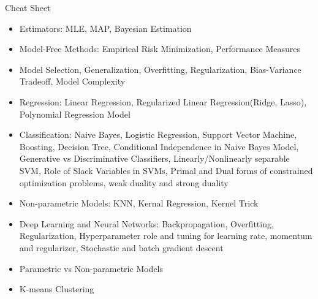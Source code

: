 \documentclass{article}
\begin{document}
Cheat Sheet
\begin{itemize}
\item Estimators: MLE, MAP, Bayesian Estimation
\item Model-Free Methods: Empirical Risk Minimization, Performance Measures
\item Model Selection, Generalization, Overfitting, Regularization, Bias-Variance Tradeoff, Model Complexity
\item Regression: Linear Regression, Regularized Linear Regression(Ridge, Lasso), Polynomial Regression Model
\item Classification: Naive Bayes, Logistic Regression, Support Vector Machine, Boosting, Decision Tree, Conditional Independence in Naive Bayes Model, Generative vs Discriminative Classifiers, Linearly/Nonlinearly separable SVM, Role of Slack Variables in SVMs, Primal and Dual forms of constrained optimization problems, weak duality and strong duality
\item Non-parametric Models: KNN, Kernal Regression, Kernel Trick
\item Deep Learning and Neural Networks: Backpropagation, Overfitting, Regularization, Hyperparameter role and tuning for learning rate, momentum and regularizer, Stochastic and batch gradient descent
\item Parametric vs Non-parametric Models
\item K-means Clustering 
\end{itemize}
\end{document}
